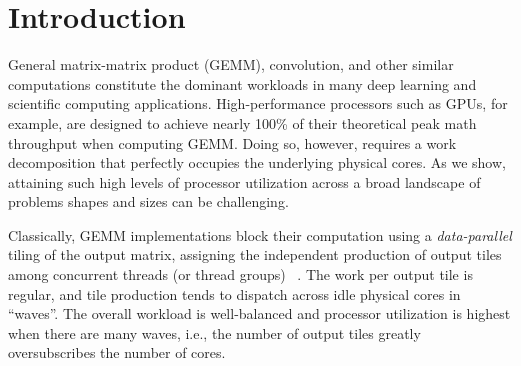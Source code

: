 \title{}

\begin{abstract}
We introduce \emph{Stream-K}, a work-centric parallelization of matrix multiplication (GEMM) and related computations in dense linear algebra. Whereas contemporary decompositions are primarily tile-based, our method operates by partitioning an even share of the aggregate inner loop iterations among physical processing elements. This provides a near-perfect utilization of computing resources, regardless of how efficiently the output tiling for any given problem quantizes across the underlying processing elements.

    On GPU processors, our \emph{Stream-K} parallelization of GEMM produces a peak speedup of up to 14$\times$ and 6.7$\times$, and an average performance response that is both higher and more consistent across 32,824 GEMM problem geometries than state-of-the-art math libraries such as CUTLASS and cuBLAS\@. Furthermore, we achieve this performance from a \emph{single} tile size configuration per floating-point precision, whereas today's math libraries employ complex kernel-selection heuristics to select from a large ensemble of kernel variants.
\end{abstract}

\section{Introduction}

General matrix-matrix product (GEMM), convolution, and other similar computations constitute the dominant workloads in many deep learning and scientific computing applications. High-performance processors such as GPUs, for example, are designed to achieve nearly 100\% of their theoretical peak math throughput when computing GEMM.  Doing so, however, requires a work decomposition that perfectly occupies the underlying physical cores.  As we show, attaining such high levels of processor utilization across a broad landscape of problems shapes and sizes can be challenging.

Classically, GEMM implementations block their computation using a 
\emph{data-parallel} tiling of the output matrix, assigning the independent production of output tiles among concurrent threads (or thread groups) ~\cite{Abdelfattah:2016:KAO,Kerr:2017:CUTLASS,Nath:2010:AIM}.  The work per output tile is regular, and tile production tends to dispatch across idle physical cores in ``waves''.  The overall workload is well-balanced and processor utilization is highest when there are many waves, i.e., the number of output tiles greatly oversubscribes the number of cores. 

